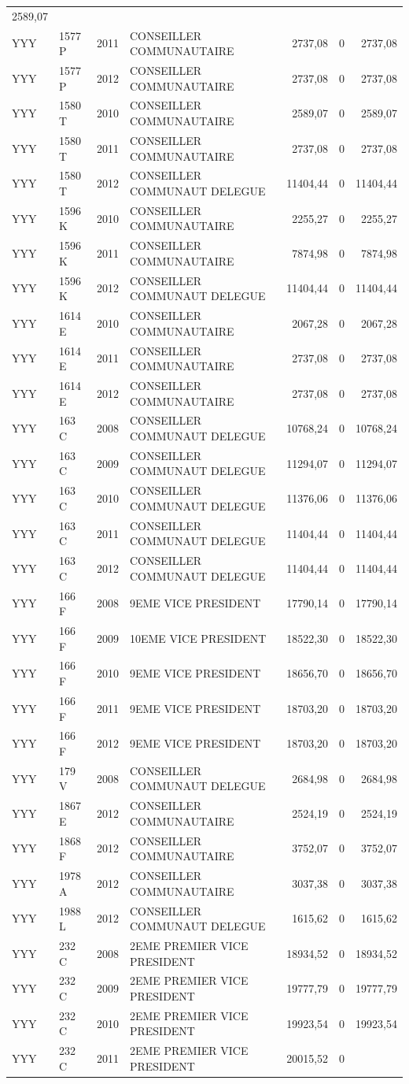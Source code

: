 \begin{longtable}[]{@{}llrlrrr@{}}
2589,07\tabularnewline
YYY & 1577 P & 2011 & CONSEILLER COMMUNAUTAIRE & 2737,08 & 0 &
2737,08\tabularnewline
YYY & 1577 P & 2012 & CONSEILLER COMMUNAUTAIRE & 2737,08 & 0 &
2737,08\tabularnewline
YYY & 1580 T & 2010 & CONSEILLER COMMUNAUTAIRE & 2589,07 & 0 &
2589,07\tabularnewline
YYY & 1580 T & 2011 & CONSEILLER COMMUNAUTAIRE & 2737,08 & 0 &
2737,08\tabularnewline
YYY & 1580 T & 2012 & CONSEILLER COMMUNAUT DELEGUE & 11404,44 & 0 &
11404,44\tabularnewline
YYY & 1596 K & 2010 & CONSEILLER COMMUNAUTAIRE & 2255,27 & 0 &
2255,27\tabularnewline
YYY & 1596 K & 2011 & CONSEILLER COMMUNAUTAIRE & 7874,98 & 0 &
7874,98\tabularnewline
YYY & 1596 K & 2012 & CONSEILLER COMMUNAUT DELEGUE & 11404,44 & 0 &
11404,44\tabularnewline
YYY & 1614 E & 2010 & CONSEILLER COMMUNAUTAIRE & 2067,28 & 0 &
2067,28\tabularnewline
YYY & 1614 E & 2011 & CONSEILLER COMMUNAUTAIRE & 2737,08 & 0 &
2737,08\tabularnewline
YYY & 1614 E & 2012 & CONSEILLER COMMUNAUTAIRE & 2737,08 & 0 &
2737,08\tabularnewline
YYY & 163 C & 2008 & CONSEILLER COMMUNAUT DELEGUE & 10768,24 & 0 &
10768,24\tabularnewline
YYY & 163 C & 2009 & CONSEILLER COMMUNAUT DELEGUE & 11294,07 & 0 &
11294,07\tabularnewline
YYY & 163 C & 2010 & CONSEILLER COMMUNAUT DELEGUE & 11376,06 & 0 &
11376,06\tabularnewline
YYY & 163 C & 2011 & CONSEILLER COMMUNAUT DELEGUE & 11404,44 & 0 &
11404,44\tabularnewline
YYY & 163 C & 2012 & CONSEILLER COMMUNAUT DELEGUE & 11404,44 & 0 &
11404,44\tabularnewline
YYY & 166 F & 2008 & 9EME VICE PRESIDENT & 17790,14 & 0 &
17790,14\tabularnewline
YYY & 166 F & 2009 & 10EME VICE PRESIDENT & 18522,30 & 0 &
18522,30\tabularnewline
YYY & 166 F & 2010 & 9EME VICE PRESIDENT & 18656,70 & 0 &
18656,70\tabularnewline
YYY & 166 F & 2011 & 9EME VICE PRESIDENT & 18703,20 & 0 &
18703,20\tabularnewline
YYY & 166 F & 2012 & 9EME VICE PRESIDENT & 18703,20 & 0 &
18703,20\tabularnewline
YYY & 179 V & 2008 & CONSEILLER COMMUNAUT DELEGUE & 2684,98 & 0 &
2684,98\tabularnewline
YYY & 1867 E & 2012 & CONSEILLER COMMUNAUTAIRE & 2524,19 & 0 &
2524,19\tabularnewline
YYY & 1868 F & 2012 & CONSEILLER COMMUNAUTAIRE & 3752,07 & 0 &
3752,07\tabularnewline
YYY & 1978 A & 2012 & CONSEILLER COMMUNAUTAIRE & 3037,38 & 0 &
3037,38\tabularnewline
YYY & 1988 L & 2012 & CONSEILLER COMMUNAUT DELEGUE & 1615,62 & 0 &
1615,62\tabularnewline
YYY & 232 C & 2008 & 2EME PREMIER VICE PRESIDENT & 18934,52 & 0 &
18934,52\tabularnewline
YYY & 232 C & 2009 & 2EME PREMIER VICE PRESIDENT & 19777,79 & 0 &
19777,79\tabularnewline
YYY & 232 C & 2010 & 2EME PREMIER VICE PRESIDENT & 19923,54 & 0 &
19923,54\tabularnewline
YYY & 232 C & 2011 & 2EME PREMIER VICE PRESIDENT & 20015,52 & 0 &

\end{longtable}
